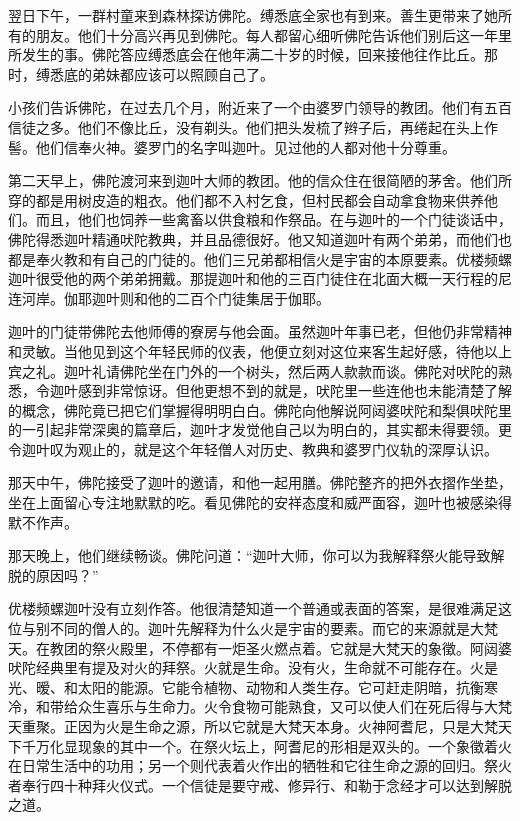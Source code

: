 \documentclass[12pt,twoside,openany]{book}
\begin{document}
翌日下午，一群村童来到森林探访佛陀。缚悉底全家也有到来。善生更带来了她所有的朋友。他们十分高兴再见到佛陀。每人都留心细听佛陀告诉他们别后这一年里所发生的事。佛陀答应缚悉底会在他年满二十岁的时候，回来接他往作比丘。那时，缚悉底的弟妹都应该可以照顾自己了。

小孩们告诉佛陀，在过去几个月，附近来了一个由婆罗门领导的教团。他们有五百信徒之多。他们不像比丘，没有剃头。他们把头发梳了辫子后，再绻起在头上作髻。他们信奉火神。婆罗门的名字叫迦叶。见过他的人都对他十分尊重。

第二天早上，佛陀渡河来到迦叶大师的教团。他的信众住在很简陋的茅舍。他们所穿的都是用树皮造的粗衣。他们都不入村乞食，但村民都会自动拿食物来供养他们。而且，他们也饲养一些禽畜以供食粮和作祭品。在与迦叶的一个门徒谈话中，佛陀得悉迦叶精通吠陀教典，并且品德很好。他又知道迦叶有两个弟弟，而他们也都是奉火教和有自己的门徒的。他们三兄弟都相信火是宇宙的本原要素。优楼频螺迦叶很受他的两个弟弟拥戴。那提迦叶和他的三百门徒住在北面大概一天行程的尼连河岸。伽耶迦叶则和他的二百个门徒集居于伽耶。

迦叶的门徒带佛陀去他师傅的寮房与他会面。虽然迦叶年事已老，但他仍非常精神和灵敏。当他见到这个年轻民师的仪表，他便立刻对这位来客生起好感，待他以上宾之礼。迦叶礼请佛陀坐在门外的一个树头，然后两人款款而谈。佛陀对吠陀的熟悉，令迦叶感到非常惊讶。但他更想不到的就是，吠陀里一些连他也未能清楚了解的概念，佛陀竟已把它们掌握得明明白白。佛陀向他解说阿闼婆吠陀和梨俱吠陀里的一引起非常深奥的篇章后，迦叶才发觉他自己以为明白的，其实都未得要领。更令迦叶叹为观止的，就是这个年轻僧人对历史、教典和婆罗门仪轨的深厚认识。

那天中午，佛陀接受了迦叶的邀请，和他一起用膳。佛陀整齐的把外衣摺作坐垫，坐在上面留心专注地默默的吃。看见佛陀的安祥态度和威严面容，迦叶也被感染得默不作声。

那天晚上，他们继续畅谈。佛陀问道：“迦叶大师，你可以为我解释祭火能导致解脱的原因吗？”

优楼频螺迦叶没有立刻作答。他很清楚知道一个普通或表面的答案，是很难满足这位与别不同的僧人的。迦叶先解释为什么火是宇宙的要素。而它的来源就是大梵天。在教团的祭火殿里，不停都有一炬圣火燃点着。它就是大梵天的象徵。阿闼婆吠陀经典里有提及对火的拜祭。火就是生命。没有火，生命就不可能存在。火是光、暧、和太阳的能源。它能令植物、动物和人类生存。它可赶走阴暗，抗衡寒冷，和带给众生喜乐与生命力。火令食物可能熟食，又可以使人们在死后得与大梵天重聚。正因为火是生命之源，所以它就是大梵天本身。火神阿耆尼，只是大梵天下千万化显现象的其中一个。在祭火坛上，阿耆尼的形相是双头的。一个象徵着火在日常生活中的功用；另一个则代表着火作出的牺牲和它往生命之源的回归。祭火者奉行四十种拜火仪式。一个信徒是要守戒、修异行、和勒于念经才可以达到解脱之道。
\end{document}
